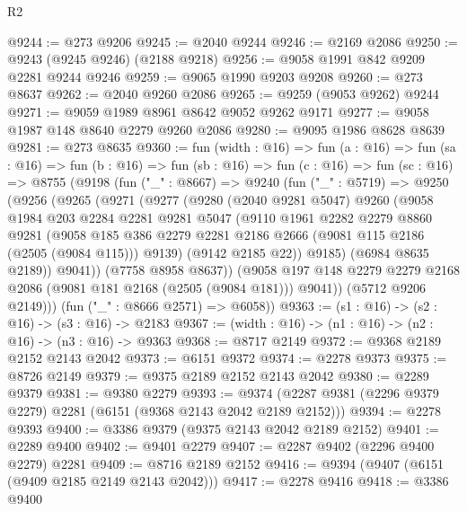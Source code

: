 \begin{lexlean}{R2}
\begin{coremodule}
@9244 := @273 @9206
@9245 := @2040 @9244
@9246 := @2169 @2086
@9250 := @9243 (@9245 @9246) (@2188 @9218)
@9256 := @9058 @1991 @842 @9209 @2281 @9244 @9246
@9259 := @9065 @1990 @9203 @9208
@9260 := @273 @8637
@9262 := @2040 @9260 @2086
@9265 := @9259 (@9053 @9262) @9244
@9271 := @9059 @1989 @8961 @8642 @9052 @9262 @9171
@9277 := @9058 @1987 @148 @8640 @2279 @9260 @2086
@9280 := @9095 @1986 @8628 @8639
@9281 := @273 @8635
@9360 := fun (width : @16) =>
  fun (a : @16) =>
  fun (sa : @16) =>
  fun (b : @16) =>
  fun (sb : @16) =>
  fun (c : @16) =>
  fun (sc : @16) =>
  @8755
    (@9198
      (fun ("_" : @8667) =>
      @9240
        (fun ("_" : @5719) =>
        @9250
          (@9256
            (@9265
              (@9271
                (@9277
                  (@9280
                    (@2040 @9281 @5047)
                    @9260
                    (@9058
                      @1984
                      @203
                      @2284
                      @2281
                      @9281
                      @5047
                      (@9110
                        @1961
                        @2282
                        @2279
                        @8860
                        @9281
                        (@9058
                          @185
                          @386
                          @2279
                          @2281
                          @2186
                          @2666
                          (@9081 @115 @2186 (@2505 (@9084 @115)))
                          @9139)
                        (@9142 @2185 @22))
                      @9185)
                    (@6984 @8635 @2189))
                  @9041))
              (@7758 @8958 @8637))
            (@9058 @197 @148 @2279 @2279 @2168 @2086 (@9081 @181 @2168 (@2505 (@9084 @181))) @9041))
          (@5712 @9206 @2149)))
      (fun ("_" : @8666 @2571) => @6058))
@9363 := (s1 : @16) -> (s2 : @16) -> (s3 : @16) -> @2183
@9367 := (width : @16) -> (n1 : @16) -> (n2 : @16) -> (n3 : @16) -> @9363
@9368 := @8717 @2149
@9372 := @9368 @2189 @2152 @2143 @2042
@9373 := @6151 @9372
@9374 := @2278 @9373
@9375 := @8726 @2149
@9379 := @9375 @2189 @2152 @2143 @2042
@9380 := @2289 @9379
@9381 := @9380 @2279
@9393 := @9374 (@2287 @9381 (@2296 @9379 @2279) @2281 (@6151 (@9368 @2143 @2042 @2189 @2152)))
@9394 := @2278 @9393
@9400 := @3386 @9379 (@9375 @2143 @2042 @2189 @2152)
@9401 := @2289 @9400
@9402 := @9401 @2279
@9407 := @2287 @9402 (@2296 @9400 @2279) @2281
@9409 := @8716 @2189 @2152
@9416 := @9394 (@9407 (@6151 (@9409 @2185 @2149 @2143 @2042)))
@9417 := @2278 @9416
@9418 := @3386 @9400

\end{coremodule}
\end{lexlean}

